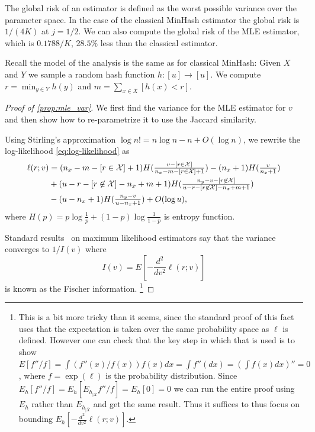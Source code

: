 The global risk of an estimator is defined as the worst possible variance over the parameter space.
In the case of the classical MinHash estimator the global risk is $1/(4K)$ at $j=1/2$.
We can also compute the global risk of the MLE estimator, which is $0.1788/K$, $28.5\%$ less than the classical estimator.

\smallskip

Recall the model of the analysis is the same as for classical MinHash:
Given $X$ and $Y$ we sample a random hash function $h:[u]\to[u]$.
We compute $r=\min_{y\in Y}h(y)$ and $m=\sum_{x\in X}[h(x)<r]$.

\begin{proof}[Proof of \cref{prop:mle_var}]
   We first find the variance for the MLE estimator for $v$ and then show how to re-parametrize it to use the Jaccard similarity.

   Using Stirling's approximation $ \log n! = n\log n - n + O(\log n)$,
   we rewrite the log-likelihood \cref{eq:log-likelihood} as
   \begin{align}
      \ell(r;v) &=
      (n_x-m-[r\in\mathcal{X}]+1)H(\tfrac{v-[r\in\mathcal{X}]}{n_x-m-[r\in\mathcal{X}]+1})
               - (n_x+1) H(\tfrac{v}{n_x+1})
              \\&+(u-r-[r\not\in\mathcal{X}]-n_x+m+1) H(\tfrac{n_y-v-[r\not\in\mathcal{X}]}{u-r-[r\not\in\mathcal{X}]-n_x+m+1})
              \\& -(u-n_x+1) H(\tfrac{n_y-v}{u-n_x+1})
   + O(\log u),
   \end{align}
   where $H(p)=p \log \frac{1}{p} + (1-p)\log \frac{1}{1-p}$ is entropy function.

   Standard results~\cite{panchenko2016lec3} on maximum likelihood estimators say that
   the variance converges to $1/I(v)$ where
   \[
      I(v) = E\left[-\frac{d^2}{dv^2}\ell(r; v)\right]
   \]
   is known as the Fischer information.
   \footnote{This is a bit more tricky than it seems, since
      the standard proof of this fact~\cite{panchenko2016lec3} uses that the expectation is taken over the same probability space as $\ell$ is defined.
      However one can check that the key step in which that is used is to show
      $E[f''/f] = \int (f''(x)/f(x))f(x)dx = \int f''(dx) = (\int f(x)dx)'' = 0$, where $f=\exp(\ell)$ is the probability distribution.
      Since $E_h[f''/f] = E_h[E_{h_{|\overline X}}f''/f] = E_h[0]= 0$
      we can run the entire proof using $E_h$ rather than $E_{h_{|\overline X}}$ and get the same result.
      Thus it suffices to thus focus on bounding $E_h[-\frac{d^2}{dv^2}\ell(r;v)]$.
   }


\end{proof}

